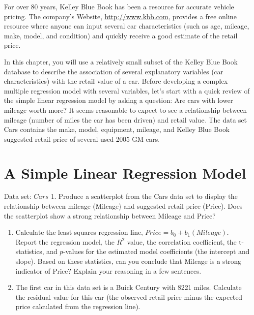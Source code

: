 \documentclass[
]{report}
\begin{document}
For over 80 years, Kelley Blue Book has been a resource for accurate vehicle pricing. The company's Website, \url{http://www.kbb.com}, provides a free online resource where anyone can input several car characteristics (such as age, mileage, make, model, and condition) and quickly receive a good estimate of the retail price.

In this chapter, you will use a relatively small subset of the Kelley Blue Book database to describe the association of several explanatory variables (car characteristics) with the retail value of a car. Before developing a complex multiple regression model with several variables, let's start with a quick review of the simple linear regression model by asking a question: Are cars with lower mileage worth more? It seems reasonable
to expect to see a relationship between mileage (number of miles the car has been driven) and retail value. The data set Cars contains the make, model, equipment, mileage, and Kelley Blue Book suggested retail price of several used 2005 GM cars.

\section*{A Simple Linear Regression Model}\label{a-simple-linear-regression-model}

Data set: \(Cars\)
1. Produce a scatterplot from the Cars data set to display the relationship between mileage (Mileage) and suggested retail price (Price). Does the scatterplot show a strong relationship between Mileage and Price?

\begin{enumerate}
\def\labelenumi{\arabic{enumi}.}
\setcounter{enumi}{1}
\item
  Calculate the least squares regression line, \(Price = b_0 + b_1(Mileage)\). Report the regression model, the \(R^2\) value, the correlation coefficient, the t-statistics, and \(p\)-values for the estimated model coefficients (the intercept and slope). Based on these statistics, can you conclude that Mileage is a strong indicator of Price? Explain your reasoning in a few sentences.
\item
  The first car in this data set is a Buick Century with 8221 miles. Calculate the residual value for this car (the observed retail price minus the expected price calculated from the regression line).
\end{enumerate}
\end{document}
